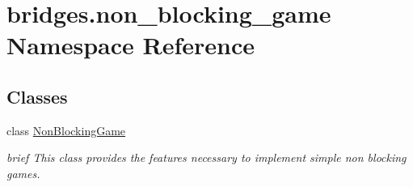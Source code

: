 \hypertarget{namespacebridges_1_1non__blocking__game}{}\section{bridges.\+non\+\_\+blocking\+\_\+game Namespace Reference}
\label{namespacebridges_1_1non__blocking__game}
\subsection*{Classes}
\begin{DoxyCompactItemize}
\item 
class \hyperlink{classbridges_1_1non__blocking__game_1_1_non_blocking_game}{Non\+Blocking\+Game}
\begin{DoxyCompactList}\small\item\em brief This class provides the features necessary to implement simple non blocking games. \end{DoxyCompactList}\end{DoxyCompactItemize}
